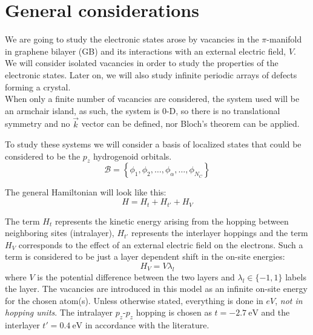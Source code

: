 \documentclass[a4paper]{article}
\begin{document}


\section{General considerations} %
We are going to study the electronic states arose by vacancies in the $\pi$-manifold in graphene bilayer (GB) and its interactions with an external electric field, $V$.
We will consider isolated vacancies in order to study the properties of the electronic states. Later on, we will also study infinite periodic arrays of defects forming a crystal.\\

When only a finite number of vacancies are considered, the system used will be an armchair island, as such, the system is $0$-D, so there is no translational symmetry and no $\vec{k}$ vector can be defined, nor Bloch's theorem can be applied.

To study these systems we will consider a basis of localized states that could be considered to be the $p_z$ hydrogenoid orbitals.
\begin{equation}
  \mathcal{B} = \left\{\phi_1,\phi_2,\dots,\phi_\alpha,\dots,\phi_{N_C}\right\}
\end{equation}

The general Hamiltonian will look like this:
\begin{equation}
  H = H_t + H_{t'} + H_{V}
\label{hamiltonian}
\end{equation}

The term $H_t$ represents the kinetic energy arising from the hopping between neighboring sites (intralayer), $H_{t'}$ represents the interlayer hoppings and the term $H_{V}$ corresponds to the effect of an external electric field on the electrons. Such a term is considered to be just a layer dependent shift in the on-site energies:
\begin{equation}
  H_{V} = V\lambda_l
\end{equation}
where $V$ is the potential difference between the two layers and $\lambda_l\in\{-1,1\}$ labels the layer.
The vacancies are introduced in this model as an infinite on-site energy for the chosen atom(s). Unless otherwise stated, everything is done in $eV$, \emph{not in hopping units}. The intralayer $p_z$-$p_z$ hopping is chosen as $t=\SI{-2.7}{\eV}$ and the interlayer $t'=\SI{0.4}{\eV}$ in accordance with the literature\cite{KatsnelsonBook}.\\
\end{document}
